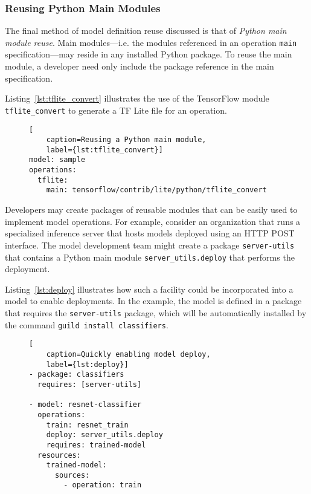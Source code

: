 \documentclass{article}
\begin{document}
\subsubsection{Reusing Python Main Modules}

The final method of model definition reuse discussed is that of
\emph{Python main module reuse}. Main modules---i.e. the modules
referenced in an operation \verb|main| specification---may reside in
any installed Python package. To reuse the main module, a developer
need only include the package reference in the main specification.

Listing~\ref{lst:tflite_convert} illustrates the use of the TensorFlow
module \verb|tflite_convert| to generate a TF Lite file for an
operation.

\begin{figure}
\begin{lstlisting}[
    caption=Reusing a Python main module,
    label={lst:tflite_convert}]
model: sample
operations:
  tflite:
    main: tensorflow/contrib/lite/python/tflite_convert
\end{lstlisting}
\end{figure}

Developers may create packages of reusable modules that can be easily
used to implement model operations. For example, consider an
organization that runs a specialized inference server that hosts
models deployed using an HTTP POST interface. The model development
team might create a package \verb|server-utils| that contains a Python
main module \verb|server_utils.deploy| that performs the
deployment.

Listing~\ref{lst:deploy} illustrates how such a facility could be
incorporated into a model to enable deployments. In the example, the
model is defined in a package that requires the \verb|server-utils|
package, which will be automatically installed by the command
\verb|guild install classifiers|.

\begin{figure}
\begin{lstlisting}[
    caption=Quickly enabling model deploy,
    label={lst:deploy}]
- package: classifiers
  requires: [server-utils]

- model: resnet-classifier
  operations:
    train: resnet_train
    deploy: server_utils.deploy
    requires: trained-model
  resources:
    trained-model:
      sources:
        - operation: train
\end{lstlisting}
\end{figure}
\end{document}
